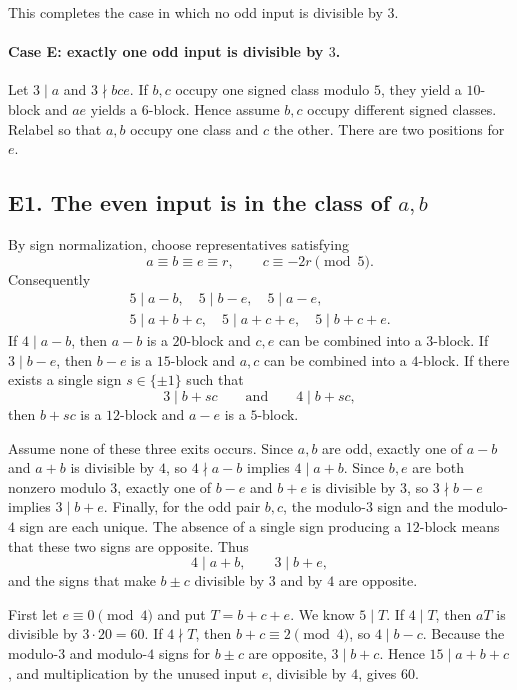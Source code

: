 This completes the case in which no odd input is divisible by $3$.

\paragraph{Case E: exactly one odd input is divisible by $3$.}
Let $3\mid a$ and $3\nmid bce$.  If $b,c$ occupy one signed class modulo
$5$, they yield a $10$-block and $ae$ yields a $6$-block.  Hence assume
$b,c$ occupy different signed classes.  Relabel so that $a,b$ occupy one
class and $c$ the other.  There are two positions for $e$.

\subsection*{\texorpdfstring{E1. The even input is in the class of $a,b$}{E1. The even input is in the class of a,b}}\label{app:caseE1}

By sign normalization, choose representatives satisfying
\[
 a\equiv b\equiv e\equiv r,
 \qquad c\equiv-2r\pmod5.
\]
Consequently
\[
\begin{gathered}
5\mid a-b,\quad 5\mid b-e,\quad5\mid a-e,\\
5\mid a+b+c,\quad5\mid a+c+e,\quad5\mid b+c+e.
\end{gathered}
\]
If $4\mid a-b$, then $a-b$ is a $20$-block and $c,e$ can be combined
into a $3$-block.  If $3\mid b-e$, then $b-e$ is a $15$-block and $a,c$
can be combined into a $4$-block.  If there exists a single sign
$s\in\{\pm1\}$ such that
\[
 3\mid b+sc
 \qquad\text{and}\qquad
 4\mid b+sc,
\]
then $b+sc$ is a $12$-block and $a-e$ is a $5$-block.

Assume none of these three exits occurs.  Since $a,b$ are odd, exactly one
of $a-b$ and $a+b$ is divisible by $4$, so $4\nmid a-b$ implies
$4\mid a+b$.  Since $b,e$ are both nonzero modulo $3$, exactly one of
$b-e$ and $b+e$ is divisible by $3$, so $3\nmid b-e$ implies
$3\mid b+e$.  Finally, for the odd pair $b,c$, the modulo-$3$ sign and the
modulo-$4$ sign are each unique.  The absence of a single sign producing a
$12$-block means that these two signs are opposite.  Thus
\[
 4\mid a+b,
 \qquad 3\mid b+e,
\]
and the signs that make $b\pm c$ divisible by $3$ and by $4$ are opposite.

First let $e\equiv0\pmod4$ and put $T=b+c+e$.  We know $5\mid T$.  If
$4\mid T$, then $aT$ is divisible by $3\cdot20=60$.  If $4\nmid T$, then
$b+c\equiv2\pmod4$, so $4\mid b-c$.  Because the modulo-$3$ and modulo-$4$
signs for $b\pm c$ are opposite, $3\mid b+c$.  Hence
$15\mid a+b+c$, and multiplication by the unused input $e$, divisible by
$4$, gives $60$.

